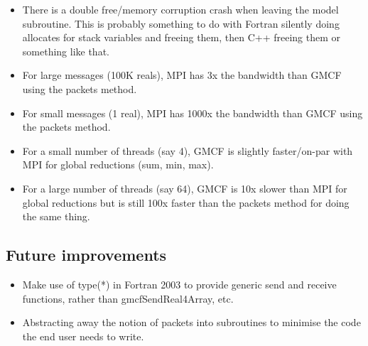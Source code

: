\documentclass{article}
\begin{document}
\begin{itemize}

    \item There is a double free/memory corruption crash when leaving the model
    subroutine. This is probably something to do with Fortran silently doing
    allocates for stack variables and freeing them, then C++ freeing them or
    something like that.

    \item For large messages (100K reals), MPI has 3x the bandwidth than GMCF
    using the packets method.

    \item For small messages (1 real), MPI has 1000x the bandwidth than GMCF
    using the packets method.

    \item For a small number of threads (say 4), GMCF is slightly faster/on-par
    with MPI for global reductions (sum, min, max).

    \item For a large number of threads (say 64), GMCF is 10x slower than MPI
    for global reductions but is still 100x faster than the packets method for
    doing the same thing.

\end{itemize}

\subsection{Future improvements}

\begin{itemize}

    \item Make use of type(*) in Fortran 2003 to provide generic send and
    receive functions, rather than gmcfSendReal4Array, etc.

    \item Abstracting away the notion of packets into subroutines to minimise
    the code the end user needs to write.

\end{itemize}
\end{document}
